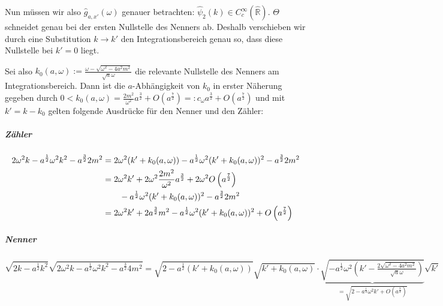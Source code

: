 Nun müssen wir also $\hat g_{a,x'}(\omega)$ genauer betrachten: $\hat\psi_2(k) \in C^\infty_c(\mathbb{\hat R})$. $\Theta$ schneidet genau bei der ersten Nullstelle des Nenners ab. Deshalb verschieben wir durch eine Substitution $k \rightarrow k'$ den Integrationsbereich genau so, dass diese Nullstelle bei $k' = 0$ liegt.

Sei also $k_0(a,\omega) := \frac{\omega-\sqrt{\omega^2 - 4a^2m^2}}{\sqrt{a}\omega}$ die relevante Nullstelle des Nenners am Integrationsbereich.
Dann ist die $a$-Abhängigkeit von $k_0$ in erster Näherung gegeben durch $0 < k_0(a,\omega) = \frac{2m^2}{\omega^2}a^{\frac{3}{2}} + O\left(a^{\frac{7}{2}}\right) =: c_\omega a^{\frac{3}{2}} + O\left(a^{\frac{7}{2}}\right)$
und mit $k'=k-k_0$ gelten folgende Ausdrücke für den Nenner und den Zähler:

\subparagraph*{Zähler}

\begin{align*}
    2 \omega^2k-a^{\frac{1}{2}} \omega^2 k^2-a^{\frac{3}{2}}2m^2
    &=
    2\omega^2(k'+k_0(a,\omega))-a^{\frac{1}{2}}\omega^2(k'+k_0(a,\omega))^2-a^{\frac{3}{2}}2m^2
    \\ &=
    2 \omega^2 k' + 2 \omega^2 \frac{2m^2}{\omega^2} a^{\frac{3}{2}}
        + 2 \omega^2 O\left(a^{\frac{7}{2}}\right)
        \\  &\kern 2em-  a^{\frac{1}{2}} \omega^2(k'+k_0(a,\omega))^2
        -a^{\frac{3}{2}}2m^2
    \\ &=
    2 \omega^2k'+2a^{\frac{3}{2}}m^2-a^{\frac{1}{2}}\omega^2(k'+k_0(a,\omega))^2
        + O\left(a^{\frac{7}{2}}\right)
\end{align*}

\subparagraph*{Nenner}
\begin{dmath*}
    \sqrt{2 k-a^{\frac{1}{2}}k^2}
    \sqrt{2 \omega^2k-a^{\frac{1}{2}}\omega^2k^2-a^{\frac{3}{2}}4m^2}
    =
    \sqrt{2-a^{\frac{1}{2}}(k'+k_0(a,\omega))} \sqrt{k'+k_0(a,\omega)}
    \cdot
    \underbrace{
    \sqrt{
            -a^{\frac{1}{2}}\omega^2\left(k'-\tfrac{2\sqrt{\omega^2-4a^2m^2}}
                    {\sqrt a \omega}\right)
        }
    }_{= \sqrt{2-a^{\frac{1}{2}}\omega^2 k' + O\left(a^{\frac{3}{2}}\right)}}
    \sqrt{k'}
\end{dmath*}

